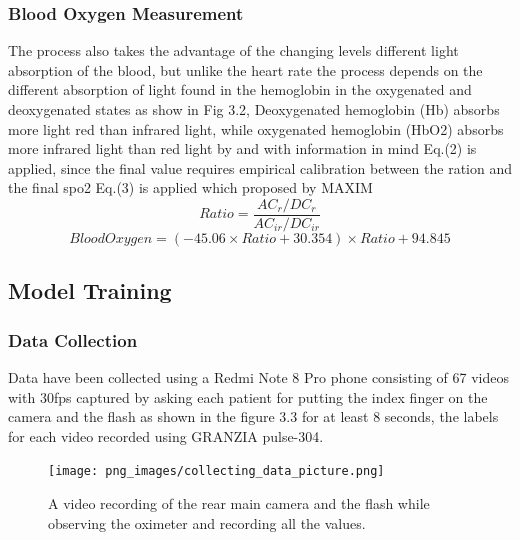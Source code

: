 \documentclass{bmcart}
\begin{document}
\subsubsection*{Blood Oxygen Measurement}
The process also takes the advantage of  the changing levels different light
absorption of the blood, but unlike the heart rate the process depends on the
different absorption of light found in the hemoglobin in the oxygenated and
deoxygenated states as show in Fig 3.2, Deoxygenated hemoglobin (Hb) absorbs
more light red than infrared light, while oxygenated hemoglobin (HbO2) absorbs
more infrared light than red light by and with information in mind Eq.(2) is
applied, since the final value requires empirical calibration between the ration
and the final spo2 Eq.(3) is applied which proposed by MAXIM%
%
\[
 Ratio = \frac{AC_r/DC_r}{AC_{ir}/DC_{ir}}
 \tag{2}
\]
\[
 Blood Oxygen = (-45.06 \times Ratio + 30.354) \times Ratio + 94.845
 \tag{3}
\]
%

\subsection*{Model Training}
\subsubsection*{Data Collection}
Data have been collected using a Redmi Note 8 Pro phone consisting of 67 videos
with 30fps captured by asking each patient for putting the index finger on the
camera and the flash as shown in the figure 3.3 for at least 8 seconds, the
labels for each video recorded using GRANZIA pulse-304.
\begin{figure}[h!]
  \texttt{[image: png\_images/collecting\_data\_picture.png]}
  \caption{
      A video recording of the rear main camera and the flash while observing
      the oximeter and recording all the values.}
\end{figure}
\FloatBarrier
\end{document}
